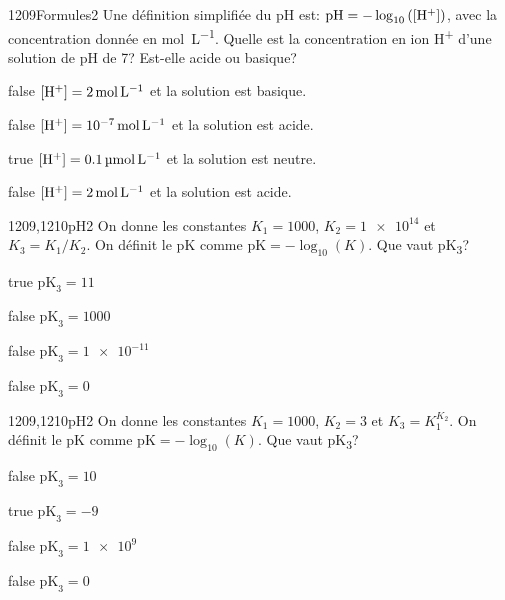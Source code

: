 \documentclass[11pt]{article}
\begin{document}
        \begin{question}{1209}{Formules}{2}{}
			Une définition simplifiée du pH est: $\text{pH} = -\log_{10}\left(\text{[H\textsuperscript{+}]}\right)$, avec la concentration donnée en \si{\mol\per\liter}. Quelle est la concentration en ion H\textsuperscript{+} d'une solution de pH de 7? Est-elle acide ou basique?
        \end{question}
        \begin{reponses}
    	    \item[false] $\text{[H\textsuperscript{+}]} = \SI{2}{\mol\per\liter}$ et la solution est basique.
    	    \item[false] $\text{[H\textsuperscript{+}]} = \SI{e-7}{\mol\per\liter}$ et la solution est acide.
    	    \item[true] $\text{[H\textsuperscript{+}]} = \SI{0.1}{\micro\mol\per\liter}$ et la solution est neutre.
    	    \item[false] $\text{[H\textsuperscript{+}]} = \SI{2}{\mol\per\liter}$ et la solution est acide.
        \end{reponses}
        
        \begin{question}{1209,1210}{pH}{2}{}
			On donne les constantes $K_1 = 1000$, $K_2 = \num{1e14}$ et $K_3 = K_1/K_2$. On définit le pK comme $\text{pK} = -\log_{10}\left(K\right)$. Que vaut pK\textsubscript{3}?
        \end{question}
        \begin{reponses}
    	    \item[true] $\text{pK}_3 = 11$
    	    \item[false] $\text{pK}_3 = 1000$
    	    \item[false] $\text{pK}_3 = \num{1e-11}$
    	    \item[false] $\text{pK}_3 = 0$
        \end{reponses}
        
        \begin{question}{1209,1210}{pH}{2}{}
			On donne les constantes $K_1 = 1000$, $K_2 = 3$ et $K_3 = K_1^{K_2}$. On définit le pK comme $\text{pK} = -\log_{10}\left(K\right)$. Que vaut pK\textsubscript{3}?
        \end{question}
        \begin{reponses}
    	    \item[false] $\text{pK}_3 = 10$    
    	    \item[true] $\text{pK}_3 = -9$
    	    \item[false] $\text{pK}_3 = \num{1e9}$
    	    \item[false] $\text{pK}_3 = 0$
        \end{reponses}
        
\end{document}
